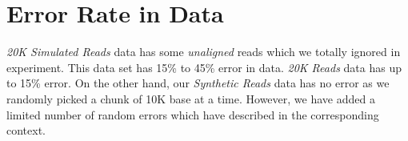 \documentclass{standalone}
\begin{document}
	\section{Error Rate in Data}
	\emph{20K Simulated Reads} data has some \emph{unaligned} reads which we totally ignored in experiment. This data set has 15\% to 45\% error in data. \emph{20K Reads} data has up to 15\% error.
	On the other hand, our \emph{Synthetic Reads} data has no error as we randomly picked a chunk of 10K base at a time. However, we have added a limited number of random errors which have described in the corresponding context.
\end{document}
